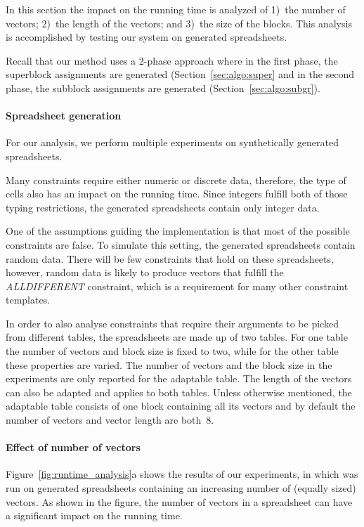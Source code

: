 In this section the impact on the running time is analyzed of 1)~the number of vectors; 2)~the length of the vectors; and 3)~the size of the blocks.
This analysis is accomplished by testing our system on generated spreadsheets.

Recall that our method uses a 2-phase approach where in the first phase, the superblock assignments are generated (Section~\ref{sec:algo:super} and in the second phase, the subblock assignments are generated (Section~\ref{sec:algo:subgr}).

\paragraph{Spreadsheet generation}
For our analysis, we perform multiple experiments on synthetically generated spreadsheets.

Many constraints require either numeric or discrete data, therefore, the type of cells also has an impact on the running time.
Since integers fulfill both of those typing restrictions, the generated spreadsheets contain only integer data.

One of the assumptions guiding the implementation is that most of the possible constraints are false.
To simulate this setting, the generated spreadsheets contain random data.
There will be few constraints that hold on these spreadsheets, however, random data is likely to produce vectors that fulfill the \textit{ALLDIFFERENT} constraint, which is a requirement for many other constraint templates.

In order to also analyse constraints that require their arguments to be picked from different tables, the spreadsheets are made up of two tables.
For one table the number of vectors and block size is fixed to two, while for the other table these properties are varied.
The number of vectors and the block size in the experiments are only reported for the adaptable table.
The length of the vectors can also be adapted and applies to both tables.
Unless otherwise mentioned, the adaptable table consists of one block containing all its vectors and by default the number of vectors and vector length are both~$8$.

\paragraph{Effect of number of vectors}
Figure~\ref{fig:runtime_analysis}a shows the results of our experiments, in which \sname was run on generated spreadsheets containing an increasing number of (equally sized) vectors.
As shown in the figure, the number of vectors in a spreadsheet can have a significant impact on the running time.

